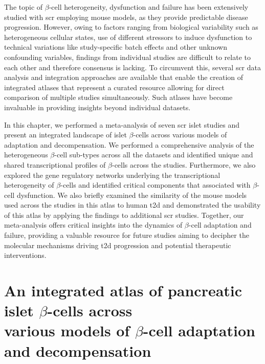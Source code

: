 \par The topic of $\beta$-cell heterogeneity, dysfunction and failure has been extensively studied with \gls{scr} employing mouse models, as they provide predictable disease progression. However, owing to factors ranging from biological variability such as heterogeneous cellular states, use of different stressors to induce dysfunction to technical variations like study-specific batch effects and other unknown confounding variables, findings from individual studies are difficult to relate to each other and therefore consensus is lacking. To circumvent this, several \gls{scr} data analysis and integration approaches are available that enable the creation of integrated atlases that represent a curated resource allowing for direct comparison of multiple studies simultaneously. Such atlases have become invaluable in providing insights beyond individual datasets.\\
\par In this chapter, we performed a meta-analysis of seven \gls{scr} islet studies and present an integrated landscape of islet $\beta$-cells across various models of adaptation and decompensation. We performed a comprehensive analysis of the heterogeneous $\beta$-cell sub-types across all the datasets and identified unique and shared transcriptional profiles of $\beta$-cells across the studies. Furthermore, we also explored the gene regulatory networks underlying the transcriptional heterogeneity of $\beta$-cells and identified critical components that associated with $\beta$-cell dysfunction. We also briefly examined the similarity of the mouse models used across the studies in this atlas to human \gls{t2d} and demonstrated the usability of this atlas by applying the findings to additional \gls{scr} studies. Together, our meta-analysis offers critical insights into the dynamics of $\beta$-cell adaptation and failure, providing a valuable resource for future studies aiming to decipher the molecular mechanisms driving \gls{t2d} progression and potential therapeutic interventions.



\section[An integrated atlas of pancreatic islet $\beta$-cells across various models of $\beta$-cell adaptation and decompensation]{An integrated atlas of pancreatic islet $\beta$-cells across\\various models of $\beta$-cell adaptation and decompensation}
\label{sec:int_atlas}

